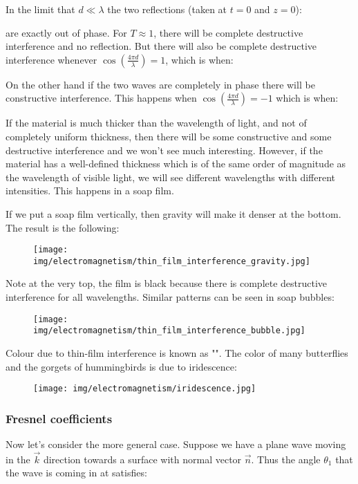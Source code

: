 	In the limit that $d \ll \lambda$ the two reflections (taken at $t=0$ and $z=0$):
	
	are exactly out of phase. For $T \approx 1$, there will be complete destructive interference and no reflection. But there will also be complete destructive interference whenever $\cos \left(\frac{4 \pi d}{\lambda}\right)=1$, which is when:
	
	On the other hand if the two waves are completely in phase there will be constructive interference. This happens when $\cos \left(\frac{4 \pi d}{\lambda}\right)=-1$ which is when:
	
	If the material is much thicker than the wavelength of light, and not of completely uniform thickness, then there will be some constructive and some destructive interference and we won't see much interesting. However, if the material has a well-defined thickness which is of the same order of magnitude as the wavelength of visible light, we will see different wavelengths with different intensities. This happens in a soap film.

	If we put a soap film vertically, then gravity will make it denser at the bottom. The result is the following:
	\begin{figure}[H]
		\centering
		\texttt{[image: img/electromagnetism/thin\_film\_interference\_gravity.jpg]}
	\end{figure}
	Note at the very top, the film is black because there is complete destructive interference for all wavelengths. Similar patterns can be seen in soap bubbles:
	\begin{figure}[H]
		\centering
		\texttt{[image: img/electromagnetism/thin\_film\_interference\_bubble.jpg]}
	\end{figure}
	Colour due to thin-film interference is known as "\label{iridescence}". The color of many butterflies and the gorgets of hummingbirds is due to iridescence:
	\begin{figure}[H]
		\centering
		\texttt{[image: img/electromagnetism/iridescence.jpg]}
	\end{figure}
	
	\subsubsection{Fresnel coefficients}
	Now let's consider the more general case. Suppose we have a plane wave moving in the $\vec{k}$ direction towards a surface with normal vector $\vec{n}$. Thus the angle $\theta_{1}$ that the wave is coming in at satisfies:
	
